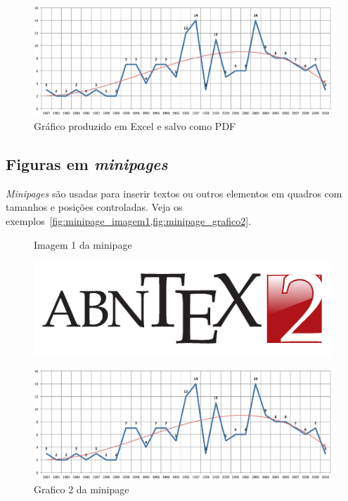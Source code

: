 \begin{figure}[htb]
	\caption{%
		\label{fig:grafico}Gráfico produzido em Excel e salvo como PDF}
	\begin{center}
		\includegraphics[scale=0.5]{graph.pdf}
	\end{center}
\end{figure}

\subsection{Figuras em \emph{minipages}}

\emph{Minipages} são usadas para inserir textos ou outros elementos em quadros
com tamanhos e posições controladas. Veja os exemplos~\cref{fig:minipage_imagem1,fig:minipage_grafico2}.

\begin{figure}[htb]%
	\label{fig:teste}
	\centering
	\begin{minipage}{0.4\textwidth}
		\centering
		\caption{Imagem 1 da minipage}%
		\label{fig:minipage_imagem1}
		\includegraphics[scale=0.9]{logo.pdf}
	\end{minipage}
	\hfill
	\begin{minipage}{0.4\textwidth}
		\centering
		\caption{Grafico 2 da minipage}%
		\label{fig:minipage_grafico2}
		\includegraphics[scale=0.2]{graph.pdf}
	\end{minipage}
\end{figure}

